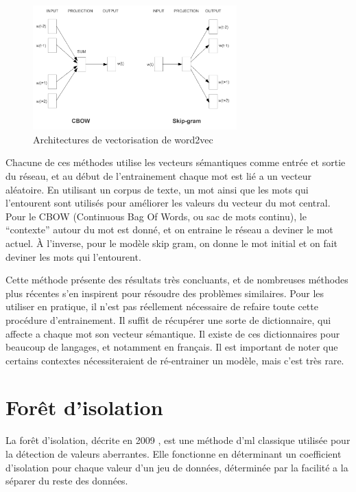 \documentclass[openany, 11pt]{memoir}
\begin{document}
\begin{figure}[ht]
	\centering
	\includegraphics[width=0.7\textwidth]{images/word2vec.png}
	\caption{Architectures de vectorisation de word2vec}
	\label{word2vec}
\end{figure}

Chacune de ces méthodes utilise les vecteurs sémantiques comme entrée et sortie du réseau, et au début de l'entrainement chaque mot est lié a un vecteur aléatoire. En utilisant un corpus de texte, un mot ainsi que les mots qui l'entourent sont utilisés pour améliorer les valeurs du vecteur du mot central. Pour le CBOW (Continuous Bag Of Words, ou sac de mots continu), le ``contexte'' autour du mot est donné, et on entraine le réseau a deviner le mot actuel. À l'inverse, pour le modèle skip gram, on donne le mot initial et on fait deviner les mots qui l'entourent.

Cette méthode présente des résultats très concluants, et de nombreuses méthodes plus récentes s'en inspirent pour résoudre des problèmes similaires. Pour les utiliser en pratique, il n'est pas réellement nécessaire de refaire toute cette procédure d'entrainement. Il suffit de récupérer une sorte de dictionnaire, qui affecte a chaque mot son vecteur sémantique. Il existe de ces dictionnaires pour beaucoup de langages, et notamment en français. Il est important de noter que certains contextes nécessiteraient de ré-entrainer un modèle, mais c'est très rare.


\section{Forêt d'isolation}

La forêt d'isolation, décrite en 2009 \cite{isolationforest}, est une méthode d'\gls{ml} classique utilisée pour la détection de valeurs aberrantes. Elle fonctionne en déterminant un coefficient d'isolation pour chaque valeur d'un jeu de données, déterminée par la facilité a la séparer du reste des données.
\end{document}
